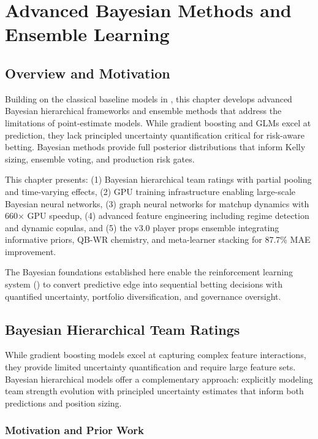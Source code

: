 \chapter{Advanced Bayesian Methods and Ensemble Learning}
\label{chap:advanced_bayesian}
\label{chap:bayesian-models}  %

\section*{Overview and Motivation}
Building on the classical baseline models in , this chapter develops advanced Bayesian hierarchical frameworks and ensemble methods that address the limitations of point-estimate models. While gradient boosting and GLMs excel at prediction, they lack principled uncertainty quantification critical for risk-aware betting. Bayesian methods provide full posterior distributions that inform Kelly sizing, ensemble voting, and production risk gates.

This chapter presents: (1) Bayesian hierarchical team ratings with partial pooling and time-varying effects, (2) GPU training infrastructure enabling large-scale Bayesian neural networks, (3) graph neural networks for matchup dynamics with 660× GPU speedup, (4) advanced feature engineering including regime detection and dynamic copulas, and (5) the v3.0 player props ensemble integrating informative priors, QB-WR chemistry, and meta-learner stacking for 87.7\% MAE improvement.

The Bayesian foundations established here enable the reinforcement learning system () to convert predictive edge into sequential betting decisions with quantified uncertainty, portfolio diversification, and governance oversight.

\section{Bayesian Hierarchical Team Ratings}\label{sec:bayesian-hierarchical}

While gradient boosting models excel at capturing complex feature interactions, they provide limited uncertainty quantification and require large feature sets. Bayesian hierarchical models offer a complementary approach: explicitly modeling team strength evolution with principled uncertainty estimates that inform both predictions and position sizing.

\subsection{Motivation and Prior Work}

